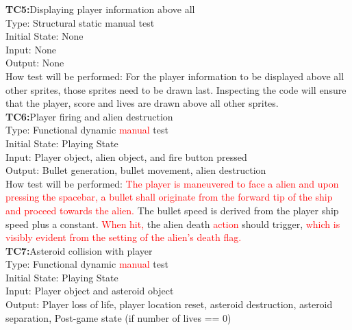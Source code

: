 \documentclass[12pt, titlepage]{article}
\begin{document}
\textbf{TC5:}Displaying player information above all\\

Type: Structural static manual test\\

Initial State: None\\

Input: None\\

Output: None\\

How test will be performed: For the player information to be displayed above all other sprites, those sprites need to be drawn last. Inspecting the code will ensure that the player, score and lives are drawn above all other sprites.\\

\textbf{TC6:}Player firing and alien destruction\\

Type: Functional dynamic \textcolor{red}{manual} test\\

Initial State: Playing State\\

Input: Player object, alien object, and fire button pressed\\

Output: Bullet generation, bullet movement, alien destruction\\

How test will be performed: \textcolor{red}{The player is maneuvered to face a alien and upon pressing the spacebar, a bullet shall originate from the forward tip of the ship and proceed towards the alien.} The bullet speed is derived from the player ship speed plus a constant. \textcolor{red}{When hit,} the alien death \textcolor{red}{action} should trigger, \textcolor{red}{which is visibly evident from the setting of the alien's death flag.}\\

\textbf{TC7:}Asteroid collision with player\\

Type: Functional dynamic \textcolor{red}{manual} test\\

Initial State: Playing State\\

Input: Player object and asteroid object\\

Output: Player loss of life, player location reset, asteroid destruction, asteroid separation, Post-game state (if number of lives == 0)\\
\end{document}
